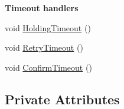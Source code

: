 \begin{Indent}{\bf Timeout handlers}\par
\begin{DoxyCompactItemize}
\item 
void \hyperlink{classns3_1_1dot11s_1_1PeerLink_aca3f4d3e0cd9305f88f968aa8c5dcadd}{Holding\+Timeout} ()
\item 
void \hyperlink{classns3_1_1dot11s_1_1PeerLink_a36d427d1e395c27c7b7b577d6dad4c63}{Retry\+Timeout} ()
\item 
void \hyperlink{classns3_1_1dot11s_1_1PeerLink_a61d3100763f4a9b377571248199b0ff5}{Confirm\+Timeout} ()
\end{DoxyCompactItemize}
\end{Indent}
\subsection*{Private Attributes}
